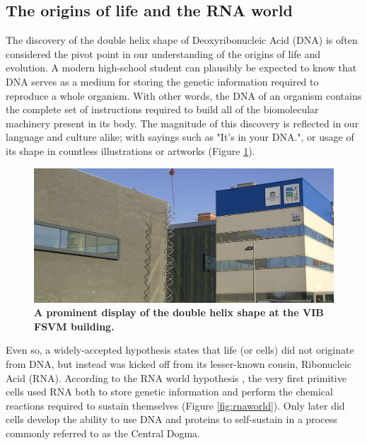 \subsection{The origins of life and the RNA world}
The discovery of the double helix shape of Deoxyribonucleic Acid (DNA) \cite{watson_molecularstructurenucleic_1953} is often considered the pivot point in our understanding of the origins of life and evolution. A modern high-school student can plausibly be expected to know that DNA serves as a medium for storing the genetic information required to reproduce a whole organism. With other words, the DNA of an organism contains the complete set of instructions required to build all of the biomolecular machinery present in its body. The magnitude of this discovery is reflected in our language and culture alike; with sayings such as "It's in your DNA.", or usage of its shape in countless illustrations or artworks (Figure \ref{fig:fsvm}).

\begin{figure}[htb!]
	\centering\includegraphics[width=.5\linewidth]{fig/fsvm3} %
	\caption{
		\textbf{A prominent display of the double helix shape at the VIB FSVM building.} %
	}
	\label{fig:fsvm}
\end{figure}

Even so, a widely-accepted hypothesis states that life (or cells) did not originate from DNA, but instead was kicked off from its lesser-known cousin, Ribonucleic Acid (RNA). According to the RNA world hypothesis \cite{alberts_rnaworldorigins_2002}, the very first primitive cells used RNA both to store genetic information and perform the chemical reactions required to sustain themselves (Figure \ref{fig:rnaworld}). Only later did cells develop the ability to use DNA and proteins to self-sustain in a process commonly referred to as the Central Dogma.


